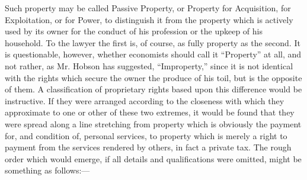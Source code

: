 \documentclass{book}
\begin{document}
Such property may be called Passive Property, or Property for Acquisition, for Exploitation, or for Power, to distinguish it from the property which is actively used by its owner for the conduct of his profession or the upkeep of his household. To the lawyer the first is, of course, as fully property as the second. It is questionable, however, whether economists should call it “Property” at all, and not rather, as Mr. Hobson has suggested, “Improperty,” since it is not identical with the rights which secure the owner the produce of his toil, but is the opposite of them. A classification of proprietary rights based upon this difference would be instructive. If they were arranged according to the closeness with which they approximate to one or other of these two extremes, it would be found that they were spread along a line stretching from property which is obviously the payment for, and condition of, personal services, to property which is merely a right to payment from the services rendered by others, in fact a private tax. The rough order which would emerge, if all details and qualifications were omitted, might be something as follows:—
\end{document}
